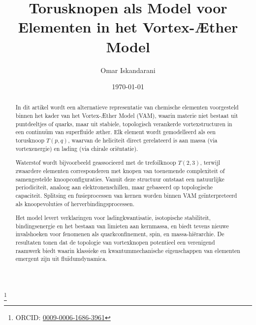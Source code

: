 \documentclass[a4paper, aps,preprint,superscriptaddress, 12pt]{revtex4}
\begin{document}
    \author{Omar Iskandarani}
    \title{Torusknopen als Model voor Elementen in het Vortex-Æther Model}

    \date{\today}
    \thanks{ORCID: \href{https://orcid.org/0009-0006-1686-3961}{0009-0006-1686-3961}}

    \begin{abstract}
        In dit artikel wordt een alternatieve representatie van chemische elementen voorgesteld binnen het kader van het Vortex-Æther Model (VAM), waarin materie niet bestaat uit puntdeeltjes of quarks, maar uit stabiele, topologisch verankerde vortexstructuren in een continuüm van superfluïde æther. Elk element wordt gemodelleerd als een torusknoop $T(p,q)$, waarvan de heliciteit direct gerelateerd is aan massa (via vortexenergie) en lading (via chirale oriëntatie).

        Waterstof wordt bijvoorbeeld geassocieerd met de trefoilknoop $T(2,3)$, terwijl zwaardere elementen corresponderen met knopen van toenemende complexiteit of samengestelde knoopconfiguraties. Vanuit deze structuur ontstaat een natuurlijke periodiciteit, analoog aan elektronenschillen, maar gebaseerd op topologische capaciteit. Splitsing en fusieprocessen van kernen worden binnen VAM geïnterpreteerd als knoopevoluties of herverbindingsprocessen.

        Het model levert verklaringen voor ladingkwantisatie, isotopische stabiliteit, bindingsenergie en het bestaan van limieten aan kernmassa, en biedt tevens nieuwe invalshoeken voor fenomenen als quarkconfinement, spin, en massa-hiërarchie. De resultaten tonen dat de topologie van vortexknopen potentieel een verenigend raamwerk biedt waarin klassieke en kwantummechanische eigenschappen van elementen emergent zijn uit fluïdumdynamica.
    \end{abstract}
    
    \maketitle

    
    
    
    
    
    
    
    
    
    
    
    
    
    
    
    


    \appendix \label{sec:Part-6}
    \label{appendix:Afleiding_massa}
    \label{appendix:Afleiding_massa_2}

    
    
\end{document}
